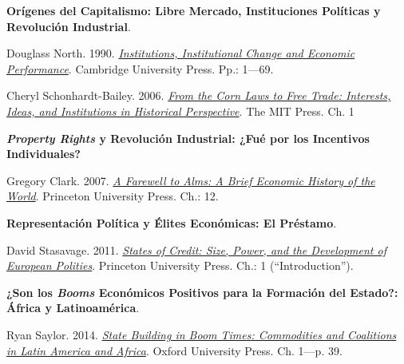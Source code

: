 \documentclass[letterpaper]{article}
\renewenvironment{itemize}{
  \begin{list}{}{
    \setlength{\leftmargin}{1.5em}
  }
}{
  \end{list}
}
\begin{document}
\begin{enumerate}[label=\roman*.]
\begin{itemize}
			\item[11.] {\bf Or\'igenes del Capitalismo: Libre Mercado, Instituciones Pol\'iticas y Revoluci\'on Industrial}.
				\begin{itemize}
					\item[$\circ$]  Douglass North. 1990. \href{https://github.com/hbahamonde/Ciencia_Politica_II/raw/master/Readings/North.pdf}{\emph{Institutions, Institutional Change and Economic Performance}}. Cambridge University Press. Pp.: 1---69.
          \item[$\circ$] Cheryl Schonhardt-Bailey. 2006. \href{https://github.com/hbahamonde/Ciencia_Politica_II/raw/master/Readings/Corn_Laws.pdf}{\emph{From the Corn Laws to Free Trade: Interests, Ideas, and Institutions in Historical Perspective}}. The MIT Press. Ch. 1
        \end{itemize}


			\item[12.] {\bf \emph{Property Rights} y Revoluci\'on Industrial: ¿Fu\'e por los Incentivos Individuales?}
				\begin{itemize}
					\item[$\circ$]  Gregory Clark. 2007. \href{https://github.com/hbahamonde/Ciencia_Politica_II/raw/master/Readings/Clark.pdf}{\emph{A Farewell to Alms: A Brief Economic History of the World}}. Princeton University Press. Ch.: 12.
				\end{itemize}


			\item[13.] {\bf Representaci\'on Pol\'itica y \'Elites Econ\'omicas: El Pr\'estamo}.
				\begin{itemize}
          \item[$\circ$]  David Stasavage. 2011. \href{https://github.com/hbahamonde/Ciencia_Politica_II/raw/master/Readings/Stasavage.pdf}{\emph{States of Credit: Size, Power, and the Development of European Polities}}. Princeton University Press. Ch.: 1 (``Introduction'').
        \end{itemize}


      \item[14.] {\bf ¿Son los \emph{Booms} Econ\'omicos Positivos para la Formaci\'on del Estado?: \'Africa y Latinoam\'erica}.
        \begin{itemize}
          \item[$\circ$] Ryan Saylor. 2014. \href{https://github.com/hbahamonde/Ciencia_Politica_II/raw/master/Readings/Saylor.pdf}{\emph{State Building in Boom Times: Commodities and Coalitions in Latin America and Africa}}. Oxford University Press. Ch. 1---p. 39.
          

\end{itemize}
\end{itemize}
\end{enumerate}
\end{document}

